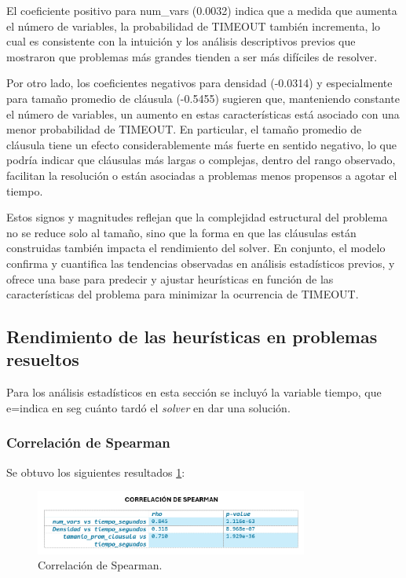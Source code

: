 El coeficiente positivo para num\_vars (0.0032) indica que a medida que aumenta el número de variables, la probabilidad de TIMEOUT también incrementa, lo cual es consistente con la intuición y los análisis descriptivos previos que mostraron que problemas más grandes tienden a ser más difíciles de resolver. 

Por otro lado, los coeficientes negativos para densidad (-0.0314) y especialmente para tamaño promedio de cláusula (-0.5455) sugieren que, manteniendo constante el número de variables, un aumento en estas características está asociado con una menor probabilidad de TIMEOUT. En particular, el tamaño promedio de cláusula tiene un efecto considerablemente más fuerte en sentido negativo, lo que podría indicar que cláusulas más largas o complejas, dentro del rango observado, facilitan la resolución o están asociadas a problemas menos propensos a agotar el tiempo.

Estos signos y magnitudes reflejan que la complejidad estructural del problema no se reduce solo al tamaño, sino que la forma en que las cláusulas están construidas también impacta el rendimiento del solver. En conjunto, el modelo confirma y cuantifica las tendencias observadas en análisis estadísticos previos, y ofrece una base para predecir y ajustar heurísticas en función de las características del problema para minimizar la ocurrencia de TIMEOUT.

\subsection{Rendimiento de las heur\'isticas en problemas resueltos}
Para los an\'alisis estad\'isticos en esta secci\'on se incluy\'o la variable tiempo, que e=indica en seg cu\'anto tard\'o el \textit{solver} en dar una soluci\'on.

\subsubsection{Correlaci\'on de Spearman}
Se obtuvo los siguientes resultados \ref{fig:correlacion-spearman}:

\begin{figure}[ht]
    \centering
    \includegraphics[width=0.8\textwidth]{Graphics/correlacion_spearman.png}
    \caption{Correlaci\'on de Spearman.}
    \label{fig:correlacion-spearman}
\end{figure}

